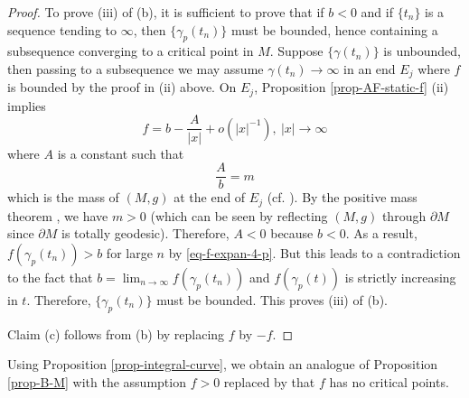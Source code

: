 \documentclass[12pt]{amsart}
\theoremstyle{remark}
\numberwithin{equation}{section}
\newcommand{\be}{\begin{equation}}
\newcommand{\ee}{\end{equation}}
\newcommand{\bee}{\begin{equation*}}
\newcommand{\eee}{\end{equation*}}
\def\p{\partial}
\begin{document}
\begin{proof}
To prove (iii) of (b), it is sufficient to prove that if $b<0$ and if $\{ t_n \}$ is a sequence tending to   $\infty$,
then  $\{ \gamma_p (t_n) \}$ must be bounded, hence containing  a subsequence converging   to a critical point in $M$.
Suppose $\{ \gamma(t_n) \} $ is unbounded,  then passing to a subsequence we may assume $ \gamma(t_n) \to \infty$
in an end $E_j$ where  $f$ is bounded by the proof in (ii)  above. On $E_j$,
Proposition \ref{prop-AF-static-f} (ii) implies
\be \label{eq-f-expan-4-p}
 f = b - \frac{A}{|x|} + o ( | x |^{-1} ) , \ |x| \rightarrow \infty
\ee
 where   $ A$ is a  constant such that
\bee
\frac{A}{b} = m
\eee
which is the mass of $(M, g)$ at the end of $E_j$ (cf. \cite{Beig-1980, Bunting-Masood}).
By the positive mass theorem \cite{SchoenYau79, Witten81},
we have $ m > 0 $ (which can be seen by reflecting $(M, g)$ through $\p M$ since $\p M$ is totally geodesic).
Therefore,    $A < 0 $ because $b<0$.
As a result, $ f (\gamma_p (t_n) ) > b $ for large $n$ by \eqref{eq-f-expan-4-p}.
 But this leads to a contradiction to the fact that $ b = \lim_{ n \rightarrow \infty} f (\gamma_p (t_n) ) $ and
  $f(\gamma_p (t))$ is strictly increasing in $t$.   Therefore, $\{ \gamma_p (t_n) \}$ must be bounded.
This  proves (iii) of (b).

Claim (c) follows from (b) by replacing $f$ by $-f$.
\end{proof}

Using Proposition \ref{prop-integral-curve}, we obtain an analogue of Proposition \ref{prop-B-M}
with the assumption  $f > 0 $ replaced by 
that $f$ has no critical points.
\end{document}
